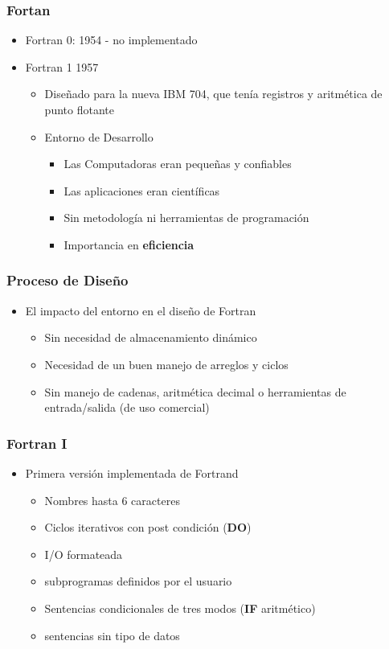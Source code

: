 \documentclass[11pt]{article}
\begin{document}
\subsubsection*{Fortan}
\label{sec:orgheadline39}
\begin{itemize}
\item Fortran 0: 1954 - no implementado
\item Fortran 1 1957
\begin{itemize}
\item Diseñado para la nueva IBM 704, que tenía registros y aritmética
de punto flotante
\item Entorno de Desarrollo
\begin{itemize}
\item Las Computadoras eran pequeñas y confiables
\item Las aplicaciones eran científicas
\item Sin metodología ni herramientas de programación
\item Importancia en \textbf{eficiencia}
\end{itemize}
\end{itemize}
\end{itemize}

\subsubsection*{Proceso de Diseño}
\label{sec:orgheadline40}
\begin{itemize}
\item El impacto del entorno en el diseño de Fortran
\begin{itemize}
\item Sin necesidad de almacenamiento dinámico
\item Necesidad de un buen manejo de arreglos y ciclos
\item Sin manejo de cadenas, aritmética decimal o herramientas de
entrada/salida (de uso comercial)
\end{itemize}
\end{itemize}

\subsubsection*{Fortran I}
\label{sec:orgheadline41}
\begin{itemize}
\item Primera versión implementada de Fortrand
\begin{itemize}
\item Nombres hasta 6 caracteres
\item Ciclos iterativos con post condición (\textbf{DO})
\item I/O formateada
\item subprogramas definidos por el usuario
\item Sentencias condicionales de tres modos (\textbf{IF} aritmético)
\item sentencias sin tipo de datos
\end{itemize}
\end{itemize}
\end{document}
